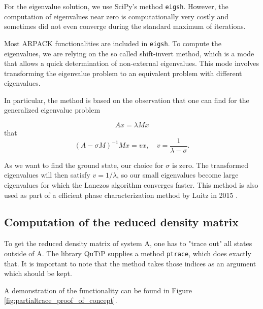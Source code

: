 \documentclass[reprint,amsmath,amssymb,aps,prb]{revtex4-2}
\begin{document}
For the eigenvalue solution, we use SciPy's method \texttt{eigsh}. However, the computation of eigenvalues near zero is computationally very costly and sometimes did not even converge during the standard maximum of iterations. 

Most ARPACK functionalities are included in \texttt{eigsh}. To compute the eigenvalues, we are relying on the so called shift-invert method, which is a mode that allows a quick determination of non-external eigenvalues. This mode involves transforming the eigenvalue problem to an equivalent problem with different eigenvalues. 

In particular, the method is based on the observation that one can find for the generalized eigenvalue problem

\begin{equation}
Ax=\lambda M x
\end{equation}
that
\begin{equation}
\left(A-\sigma M\right)^{-1}Mx = vx, \quad v=\frac{1}{\lambda-\sigma}.
\end{equation}

As we want to find the ground state, our choice for $\sigma$ is zero. The transformed eigenvalues will then satisfy $v=1/\lambda$, so our small eigenvalues  become large eigenvalues for which the Lanczos algorithm converges faster.\cite{Virtanen_2020} This method is also used as part of a efficient phase characterization method by Luitz in 2015 \cite{Luitz2015}.

\subsection{Computation of the reduced density matrix}

To get the reduced density matrix of system A, one has to "trace out" all states outside of A. The library QuTiP supplies a method \texttt{ptrace}, which does exactly that. It is important to note that the method takes those indices as an argument which should be kept.\cite{Johansson2012}

A demonstration of the functionality can be found in Figure \ref{fig:partialtrace_proof_of_concept}.
\end{document}

